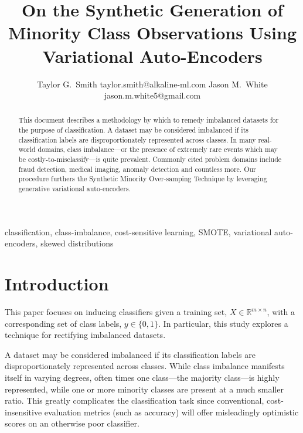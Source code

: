 \documentclass[twoside,11pt]{article}
\begin{document}
\title{On the Synthetic Generation of Minority Class Observations Using Variational Auto-Encoders}

\author{\name Taylor G.\ Smith \email taylor.smith@alkaline-ml.com
       \AND
       \name Jason M.\ White \email jason.m.white5@gmail.com}

\maketitle

\begin{abstract}%
This document describes a methodology by which to remedy imbalanced datasets for the purpose of classification. A dataset may be considered imbalanced if its classification labels are disproportionately represented across classes. In many real-world domains, class imbalance---or the presence of extremely rare events which may be costly-to-misclassify---is quite prevalent. Commonly cited problem domains include fraud detection, medical imaging, anomaly detection and countless more.  Our procedure furthers the Synthetic Minority Over-samping Technique \citep{chawla2002smote} by leveraging generative variational auto-encoders.
\end{abstract}

\begin{keywords}
  classification, class-imbalance, cost-sensitive learning, SMOTE, variational auto-encoders, skewed distributions
\end{keywords}

\section{Introduction}

This paper focuses on inducing classifiers given a training set, $X \in \mathbb{R}^{m \times n}$, with a corresponding set of class labels, $y \in \{0, 1\}$. In particular, this study explores a technique for rectifying imbalanced datasets.

A dataset may be considered imbalanced if its classification labels are disproportionately represented across classes. While class imbalance manifests itself in varying degrees, often times one class---the majority class---is highly represented, while one or more minority classes are present at a much smaller ratio. This greatly complicates the classification task since conventional, cost-insensitive evaluation metrics (such as accuracy) will offer misleadingly optimistic scores on an otherwise poor classifier.
\end{document}
